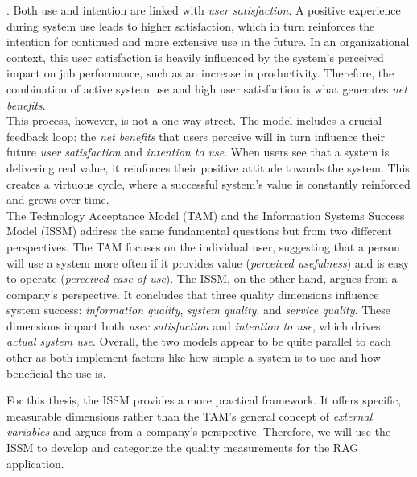 \documentclass[
	english,
	ruledheaders=section,%
	class=report,%
	thesis={type=bachelor},%
	accentcolor=1b,%
	custommargins=true,%
	marginpar=false,%
	parskip=half-,%
	fontsize=11pt,%
	DIV=14,
]{tudapub}
\begin{document}
\parencite{DeloneMcLean2003ISSuccessTenYearUpdate}. Both use and intention are linked with \textit{user satisfaction}. A positive experience during system use leads to higher satisfaction, which in turn reinforces the intention for continued and more extensive use in the future. In an organizational context, this user satisfaction is heavily influenced by the system's perceived impact on job performance, such as an increase in productivity. Therefore, the combination of active system use and high user satisfaction is what generates \textit{net benefits}.\\
This process, however, is not a one-way street. The model includes a crucial feedback loop: the \textit{net benefits} that users perceive will in turn influence their future \textit{user satisfaction} and \textit{intention to use}. When users see that a system is delivering real value, it reinforces their positive attitude towards the system. This creates a virtuous cycle, where a successful system's value is constantly reinforced and grows over time.\\

The Technology Acceptance Model (TAM) and the Information Systems Success Model (ISSM) address the same fundamental questions but from two different perspectives. The TAM focuses on the individual user, suggesting that a person will use a system more often if it provides value (\textit{perceived usefulness}) and is easy to operate (\textit{perceived ease of use}).
The ISSM, on the other hand, argues from a company's perspective. It concludes that three quality dimensions influence system success: \textit{information quality}, \textit{system quality}, and \textit{service quality}. These dimensions impact both \textit{user satisfaction} and \textit{ intention to use}, which drives \textit{actual system use}. Overall, the two models appear to be quite parallel to each other as both implement factors like how simple a system is to use and how beneficial the use is.

For this thesis, the ISSM provides a more practical framework. It offers specific, measurable dimensions rather than the TAM's general concept of \textit{external variables} and argues from a company's perspective. Therefore, we will use the ISSM to develop and categorize the quality measurements for the RAG application.

\newpage
\end{document}
